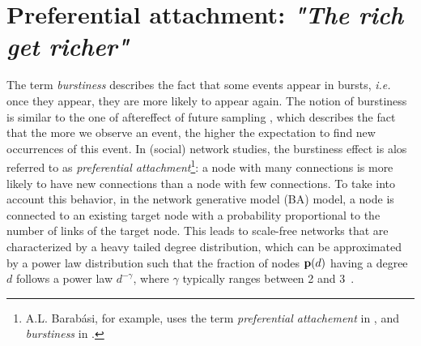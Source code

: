 \section{Preferential attachment: \emph{"The rich get richer"}}
\label{sec:burstiness}

The term \textit{burstiness} describes the fact that some events appear in bursts, \textit{i.e.} once they appear, they are more likely to appear again. The notion of burstiness is similar to the one of aftereffect of future sampling \cite{feller_68}, which describes the fact that the more we observe an event, the higher the expectation to find new occurrences of this event. In (social) network studies, the burstiness effect is alos referred to as \textit{preferential attachment}\footnote{A.L. Barab\'asi, for example, uses the term \textit{preferential attachement} in \cite{barabasi1999emergence}, and \textit{burstiness} in \cite{barabasi_burst}.}: a node with many connections is more likely to have new connections than a node with few connections. To take into account this behavior, in the network generative model  (BA) \cite{albert2002statistical} model, a node is connected to an existing target node with a probability proportional to the number of links of the target node. This leads to scale-free networks that are characterized by a heavy tailed degree distribution, which can be approximated by a power law distribution such that the fraction of nodes $\mathbf{p}(d)$ having a degree $d$ follows a power law $d^{-\gamma}$, where $\gamma$ typically ranges between 2 and 3~\cite{barabasi1999emergence}. 

